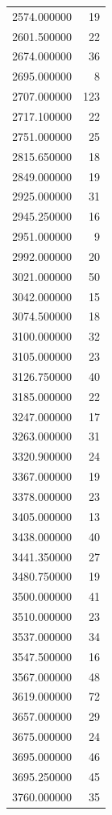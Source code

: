 \begin{tabular}{lr}
2574.000000   &    19 \\
2601.500000   &    22 \\
2674.000000   &    36 \\
2695.000000   &     8 \\
2707.000000   &   123 \\
2717.100000   &    22 \\
2751.000000   &    25 \\
2815.650000   &    18 \\
2849.000000   &    19 \\
2925.000000   &    31 \\
2945.250000   &    16 \\
2951.000000   &     9 \\
2992.000000   &    20 \\
3021.000000   &    50 \\
3042.000000   &    15 \\
3074.500000   &    18 \\
3100.000000   &    32 \\
3105.000000   &    23 \\
3126.750000   &    40 \\
3185.000000   &    22 \\
3247.000000   &    17 \\
3263.000000   &    31 \\
3320.900000   &    24 \\
3367.000000   &    19 \\
3378.000000   &    23 \\
3405.000000   &    13 \\
3438.000000   &    40 \\
3441.350000   &    27 \\
3480.750000   &    19 \\
3500.000000   &    41 \\
3510.000000   &    23 \\
3537.000000   &    34 \\
3547.500000   &    16 \\
3567.000000   &    48 \\
3619.000000   &    72 \\
3657.000000   &    29 \\
3675.000000   &    24 \\
3695.000000   &    46 \\
3695.250000   &    45 \\
3760.000000   &    35 \\

\end{tabular}
